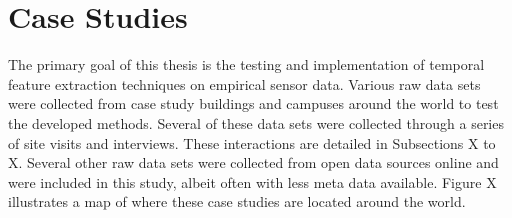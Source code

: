 \section{Case Studies}
\label{sec:casestudies}

The primary goal of this thesis is the testing and implementation of temporal feature extraction techniques on empirical sensor data. Various raw data sets were collected from case study buildings and campuses around the world to test the developed methods. Several of these data sets were collected through a series of site visits and interviews. These interactions are detailed in Subsections X to X. Several other raw data sets were collected from open data sources online and were included in this study, albeit often with less meta data available. Figure X illustrates a map of where these case studies are located around the world.